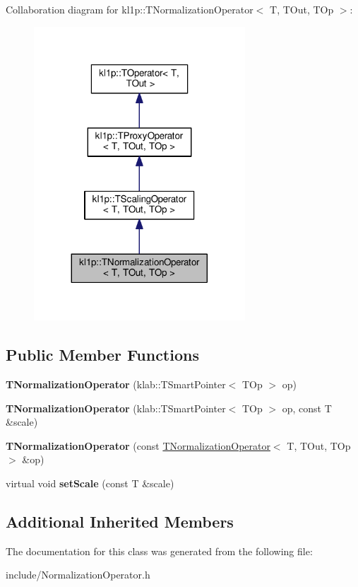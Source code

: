 Collaboration diagram for kl1p\+:\+:T\+Normalization\+Operator$<$ T, T\+Out, T\+Op $>$\+:
\nopagebreak
\begin{figure}[H]
\begin{center}
\leavevmode
\includegraphics[width=224pt]{classkl1p_1_1TNormalizationOperator__coll__graph}
\end{center}
\end{figure}
\subsection*{Public Member Functions}
\begin{DoxyCompactItemize}
\item 
{\bfseries T\+Normalization\+Operator} (klab\+::\+T\+Smart\+Pointer$<$ T\+Op $>$ op)\hypertarget{classkl1p_1_1TNormalizationOperator_ab2c83885bc058be97c285101591bacab}{}\label{classkl1p_1_1TNormalizationOperator_ab2c83885bc058be97c285101591bacab}

\item 
{\bfseries T\+Normalization\+Operator} (klab\+::\+T\+Smart\+Pointer$<$ T\+Op $>$ op, const T \&scale)\hypertarget{classkl1p_1_1TNormalizationOperator_ac0a805e7efc72c80ceb003ddd93562ab}{}\label{classkl1p_1_1TNormalizationOperator_ac0a805e7efc72c80ceb003ddd93562ab}

\item 
{\bfseries T\+Normalization\+Operator} (const \hyperlink{classkl1p_1_1TNormalizationOperator}{T\+Normalization\+Operator}$<$ T, T\+Out, T\+Op $>$ \&op)\hypertarget{classkl1p_1_1TNormalizationOperator_a606a3d51f4bb1b30c7e95d2f129c8282}{}\label{classkl1p_1_1TNormalizationOperator_a606a3d51f4bb1b30c7e95d2f129c8282}

\item 
virtual void {\bfseries set\+Scale} (const T \&scale)\hypertarget{classkl1p_1_1TNormalizationOperator_a99e1aba0b711335ce550cbbb9b18cc85}{}\label{classkl1p_1_1TNormalizationOperator_a99e1aba0b711335ce550cbbb9b18cc85}

\end{DoxyCompactItemize}
\subsection*{Additional Inherited Members}


The documentation for this class was generated from the following file\+:\begin{DoxyCompactItemize}
\item 
include/Normalization\+Operator.\+h\end{DoxyCompactItemize}
